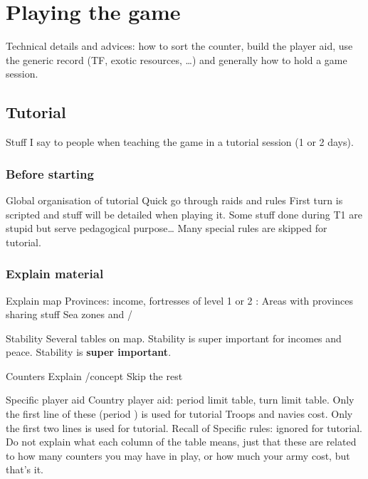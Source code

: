
\chapter{Playing the game}\label{chapter:Playing}

\begin{todo}
  Technical details and advices: how to sort the counter, build the player
  aid, use the generic record (TF, exotic resources, \ldots) and generally how
  to hold a game session.
\end{todo}

\section{Tutorial}
Stuff I say to people when teaching the game in a tutorial session (1 or 2
days).
\subsection{Before starting}
\aparag Global organisation of tutorial
\bparag Quick go through raids and rules
\bparag First turn is scripted and stuff will be detailed when playing it.
\bparag Some stuff done during T1 are stupid but serve pedagogical
purpose\ldots
\bparag Many special rules are skipped for tutorial.

\subsection{Explain material}
\aparag Explain map
\bparag Provinces: income, fortresses of level 1 or 2
\bparag \ROTW: Areas with provinces sharing stuff
\bparag Sea zones and \CTZ/\STZ

\aparag Stability
\bparag Several tables on \ROTW map.
\bparag Stability is super important for incomes and peace.
\bparag Stability is \textbf{super important}.

\aparag Counters
\bparag Explain \faceplus/\facemoins concept
\bparag Skip the rest

\aparag Specific player aid
\bparag Country player aid: period limit table, turn limit table. Only the
first line of these (period ) is used for tutorial
\bparag Troops and navies cost. Only the first two lines is used for tutorial.
\bparag Recall of Specific rules: ignored for tutorial.
\bparag Do not explain what each column of the table means, just that these
are related to how many counters you may have in play, or how much your army
cost, but that's it.

